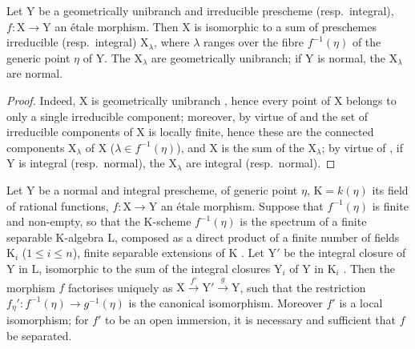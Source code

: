\begin{proposition}[18.10.7]
\label{IV.18.10.7}
Let $\mathrm{Y}$ be a geometrically unibranch and irreducible prescheme (resp.\ integral), $f:\mathrm{X}\to\mathrm{Y}$ an \'etale morphism.
Then $\mathrm{X}$ is isomorphic to a sum of preschemes irreducible (resp.\ integral) $\mathrm{X}_\lambda$, where $\lambda$ ranges over the fibre $f^{-1}(\eta)$ of the generic point $\eta$ of $\mathrm{Y}$.
The $\mathrm{X}_\lambda$ are geometrically unibranch; if $\mathrm{Y}$ is normal, the $\mathrm{X}_\lambda$ are normal.
\end{proposition}

\begin{proof}
Indeed, $\mathrm{X}$ is geometrically unibranch , hence every point of $\mathrm{X}$ belongs to only a single irreducible component; moreover, by virtue of  and  the set of irreducible components of $\mathrm{X}$ is locally finite, hence  these are the connected components $\mathrm{X}_\lambda$ of $\mathrm{X}$ ($\lambda\in f^{-1}(\eta)$), and $\mathrm{X}$ is the sum of the $\mathrm{X}_\lambda$; by virtue of , if $\mathrm{Y}$ is integral (resp.\ normal), the $\mathrm{X}_\lambda$ are integral (resp.\ normal).
\end{proof}

\begin{proposition}[18.10.8]
\label{IV.18.10.8}
Let $\mathrm{Y}$ be a normal and integral prescheme, of generic point $\eta$, $\mathrm{K}=k(\eta)$ its field of rational functions, $f:\mathrm{X}\to\mathrm{Y}$ an \'etale morphism.
Suppose that $f^{-1}(\eta)$ is finite and non-empty, so that the $\mathrm{K}$-scheme $f^{-1}(\eta)$ is the spectrum of a finite separable $\mathrm{K}$-algebra $\mathrm{L}$, composed as a direct product of a finite number of fields $\mathrm{K}_i$ ($1\leq i\leq n$), finite separable extensions of $\mathrm{K}$ .
Let $\mathrm{Y}'$ be the integral closure of $\mathrm{Y}$ in $\mathrm{L}$, isomorphic to the sum of the integral closures $\mathrm{Y}_i$ of $\mathrm{Y}$ in $\mathrm{K}_i$ .
Then the morphism $f$ factorises uniquely as $\mathrm{X}\xrightarrow{f'}\mathrm{Y}'\xrightarrow{g}\mathrm{Y}$, such that the restriction $f_\eta':f^{-1}(\eta)\to g^{-1}(\eta)$ is the canonical isomorphism.
Moreover $f'$ is a local isomorphism; for $f'$ to be an open immersion, it is necessary and sufficient that $f$ be separated.
\end{proposition}

